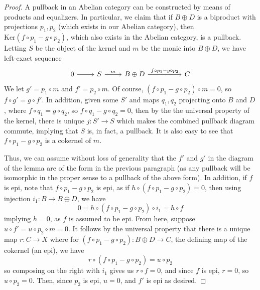 \documentclass[aps,pra,showpacs,notitlepage,onecolumn,superscriptaddress,nofootinbib]{revtex4-1}
\theoremstyle{definition}
\begin{document}
\begin{proof}
  A pullback in an Abelian category can be constructed by means of products and equalizers. In particular, we claim that if $B \oplus D$ is a biproduct with projections $p_1, p_2$ (which
  exists in our Abelian category), then $\text{Ker}(f \circ p_1 - g \circ p_2)$, which also exists in the Abelian category, is a pullback. Letting $S$ be the object of the kernel
  and $m$ be the monic into $B \oplus D$, we have left-exact sequence
  \[\begin{tikzcd}
	0 & S & {B \oplus D} && C
	\arrow[from=1-1, to=1-2]
	\arrow["m", from=1-2, to=1-3]
	\arrow["{f \circ p_1 - g \circ p_2}", from=1-3, to=1-5]
  \end{tikzcd}\]
  We let $g' = p_1 \circ m$ and $f' = p_2 \circ m$. Of course, $(f \circ p_1 - g \circ p_2) \circ m = 0$, so $f \circ g' = g \circ f'$. In addition, given some $S'$ and maps $q_1, q_2$
  projecting onto $B$ and $D$, where $f \circ q_1 = g \circ q_2$, so $f \circ q_1 - g \circ q_2 = 0$, then by the the universal property of the kernel, there is unique $j : S' \rightarrow S$
  which makes the combined pullback diagram commute, implying that $S$ is, in fact, a pullback. It is also easy to see that $f \circ p_1 - g \circ p_2$ is a cokernel of $m$.

  Thus, we can assume without loss of generality that the $f'$ and $g'$ in the diagram of the lemma
  are of the form in the previous paragraph (as any pullback will be isomorphic in the proper sense to a pullback of the above form).
  In addition, if $f$ is epi, note that $f \circ p_1 - g \circ p_2$ is epi, as if $h \circ (f \circ p_1 - g \circ p_2) = 0$, then using injection $i_1 : B \rightarrow B \oplus D$,
  we have
  \begin{equation}
    0 = h \circ (f \circ p_1 - g \circ p_2) \circ i_1 = h \circ f
    \end{equation}
  implying $h = 0$, as $f$ is assumed to be epi. From here, suppose $u \circ f' = u \circ p_2 \circ m = 0$. It follows by the universal property that there is a unique map $r : C \rightarrow X$ where for
  $(f \circ p_1 - g \circ p_2) : B \oplus D \rightarrow C$, the defining map of the cokernel (an epi), we have
  \begin{equation}
    r \circ (f \circ p_1 - g \circ p_2) = u \circ p_2
    \end{equation}
  so composing on the right with $i_1$ gives us $r \circ f = 0$, and since $f$ is epi, $r = 0$, so $u \circ p_2 = 0$. Then, since $p_2$ is epi, $u = 0$, and $f'$ is epi as desired.


\end{proof}
\end{document}
